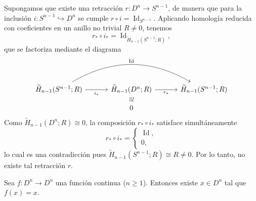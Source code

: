 \begin{dem}
Supongamos que existe una retracción $r \colon D^n \to S^{n-1}$, de manera que para la inclusión $i \colon S^{n-1} \hookrightarrow D^n$ se cumple $r \circ i = \operatorname{Id}_{S^{n-1}}$. Aplicando homología reducida con coeficientes en un anillo no trivial $R \neq 0$, tenemos
\[
r_* \circ i_* = \operatorname{Id}_{\widetilde{H}_{n-1}(S^{n-1}; R)},
\]
que se factoriza mediante el diagrama
\[
\begin{tikzcd}[column sep=3.2em, row sep=1.0em]
\widetilde{H}_{n-1}(S^{n-1}; R)
    \arrow[r, "i_*"']
    \arrow[rr, bend left=30, "\operatorname{Id}"]
& \widetilde{H}_{n-1}(D^n; R)
    \arrow[r, "r_*"']
    \arrow[d, phantom, "\cong"{description, sloped, inner sep=1pt}]
& \widetilde{H}_{n-1}(S^{n-1}; R) \\
& 0 &
\end{tikzcd}
\]
Como $\widetilde{H}_{n-1}(D^n; R) \cong 0$, la composición $r_* \circ i_*$ satisface simultáneamente
\[
r_* \circ i_* =
\begin{cases}
\operatorname{Id}, \\
0,
\end{cases}
\]
lo cual es una contradicción pues $\widetilde{H}_{n-1}(S^{n-1}; R) \cong R \neq 0$. Por lo tanto, no existe tal retracción $r$.
\end{dem}
\begin{teorema}
Sea $f \colon D^n \to D^n$ una función continua ($n \geq 1$). Entonces existe $x \in D^n$ tal que $f(x) = x$.
\end{teorema}

